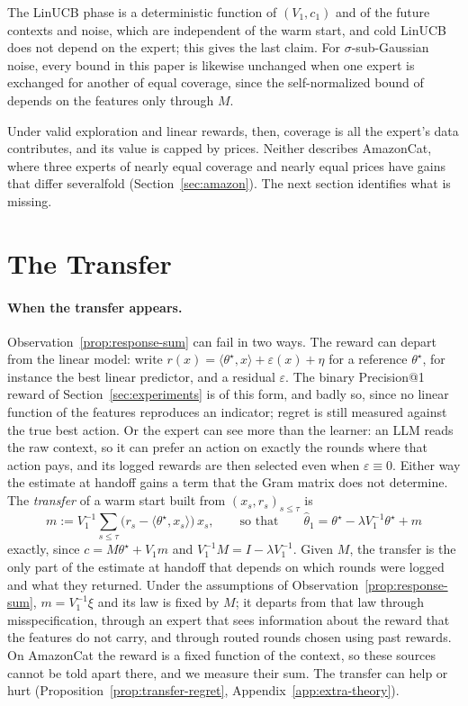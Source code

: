 \documentclass[anon]{alt2027} %
\begin{document}
The LinUCB phase is a deterministic function of $(V_1,c_1)$ and of the future
contexts and noise, which are independent of the warm start, and cold LinUCB
does not depend on the expert; this gives the last claim. For
$\sigma$-sub-Gaussian noise, every bound in this paper is likewise unchanged
when one expert is exchanged for another of equal coverage, since the
self-normalized bound of \citet{abbasi2011improved} depends on the features
only through $M$.

Under valid exploration and linear rewards, then, coverage is all the
expert's data contributes, and its value is capped by prices. Neither
describes AmazonCat, where three experts of nearly equal coverage and nearly
equal prices have gains that differ severalfold (Section~\ref{sec:amazon}).
The next section identifies what is missing.

\section{The Transfer}
\label{sec:two-channels}

\paragraph{When the transfer appears.}
Observation~\ref{prop:response-sum} can fail in two ways. The reward can
depart from the linear model: write
$r(x)=\langle\theta^\star,x\rangle+\varepsilon(x)+\eta$ for a reference
$\theta^\star$, for instance the best linear predictor, and a residual
$\varepsilon$. The binary Precision@1 reward of
Section~\ref{sec:experiments} is of this form, and badly so, since no linear
function of the features reproduces an indicator; regret is still measured
against the true best action. Or the expert can see more than the learner: an
LLM reads the raw context, so it can prefer an action on exactly the rounds
where that action pays, and its logged rewards are then selected even when
$\varepsilon\equiv0$. Either way the estimate at handoff gains a term that the
Gram matrix does not determine. The \emph{transfer} of a warm start built
from $(x_s,r_s)_{s\le\tau}$ is
\begin{equation}
\label{eq:transfer}
m:=V_1^{-1}\sum_{s\le\tau}\bigl(r_s-\langle\theta^\star,x_s\rangle\bigr)\,x_s,
\qquad\text{so that}\qquad
\widehat\theta_1=\theta^\star-\lambda V_1^{-1}\theta^\star+m
\end{equation}
exactly, since $c=M\theta^\star+V_1m$ and $V_1^{-1}M=I-\lambda V_1^{-1}$.
Given $M$, the transfer is the only part of the estimate at handoff that
depends on which rounds were logged and what they returned. Under the
assumptions of Observation~\ref{prop:response-sum}, $m=V_1^{-1}\xi$ and its
law is fixed by $M$; it departs from that law through misspecification,
through an expert that sees information about the reward that the features
do not carry, and through routed rounds chosen using past rewards. On
AmazonCat the reward is a fixed function of the context, so these sources
cannot be told apart there, and we measure their sum. The transfer can help
or hurt (Proposition~\ref{prop:transfer-regret},
Appendix~\ref{app:extra-theory}).
\end{document}
